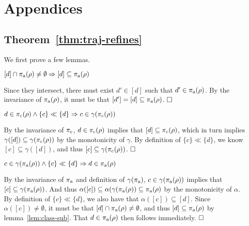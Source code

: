 \section{Appendices}

\subsection{Theorem~\ref{thm:traj-refines}}

We first prove a few lemmas.

\begin{lemma} \label{lem:class-sub}
$[d] \cap \operatorname{\pi_{\textrm{a}}}(\rho) \neq \emptyset \Rightarrow [d] \subseteq \operatorname{\pi_{\textrm{a}}}(\rho)$
\end{lemma}

Since they intersect, there must exist $d' \in [d]$ such that $d' \in \operatorname{\pi_{\textrm{a}}}(\rho)$. By the invariance of $\operatorname{\pi_{\textrm{a}}}(\rho)$, it must be that $[d'] = [d] \subseteq \operatorname{\pi_{\textrm{a}}}(\rho)$. $\qedbox$

\begin{lemma} \label{lem:traj-con}
$d \in \operatorname{\pi_{\textrm{c}}}(\rho) \wedge \{ c \} \ll \{ d \} \Rightarrow c \in \gamma(\operatorname{\pi_{\textrm{c}}}(\rho))$
\end{lemma}

By the invariance of $\operatorname{\pi_{\textrm{c}}}$, $d \in \operatorname{\pi_{\textrm{c}}}(\rho)$ implies that $[d] \subseteq \operatorname{\pi_{\textrm{c}}}(\rho)$, which in turn implies $\gamma([d]) \subseteq \gamma(\operatorname{\pi_{\textrm{c}}}(\rho))$ by the monotonicity of $\gamma$. By definition of $\{ c \} \ll \{ d \}$, we know $[c] \subseteq \gamma([d])$, and thus $[c] \subseteq \gamma(\operatorname{\pi_{\textrm{c}}}(\rho))$. $\qedbox$

\begin{lemma} \label{lem:traj-ant}
$c \in \gamma(\operatorname{\pi_{\textrm{a}}}(\rho)) \wedge \{ c \} \ll \{ d \} \Rightarrow d \in \operatorname{\pi_{\textrm{a}}}(\rho)$
\end{lemma}

By the invariance of $\operatorname{\pi_{\textrm{a}}}$ and definition of $\gamma(\operatorname{\pi_{\textrm{a}}})$, $c \in \gamma(\operatorname{\pi_{\textrm{a}}}(\rho))$ implies that $[c] \subseteq \gamma(\operatorname{\pi_{\textrm{a}}}(\rho))$. And thus $\alpha([c]) \subseteq \alpha(\gamma(\operatorname{\pi_{\textrm{a}}}(\rho)) \subseteq \operatorname{\pi_{\textrm{a}}}(\rho)$ by the monotonicity of $\alpha$. By definition of $\{ c \} \ll \{ d \}$, we also have that $\alpha([c]) \subseteq [d]$. Since $\alpha([c]) \neq \emptyset$, it must be that $[d] \cap \operatorname{\pi_{\textrm{a}}}(\rho) \neq \emptyset$, and thus $[d] \subseteq \operatorname{\pi_{\textrm{a}}}(\rho)$ by lemma~\ref{lem:class-sub}. That $d \in \operatorname{\pi_{\textrm{a}}}(\rho)$ then follows immediately. $\qedbox$
\\

